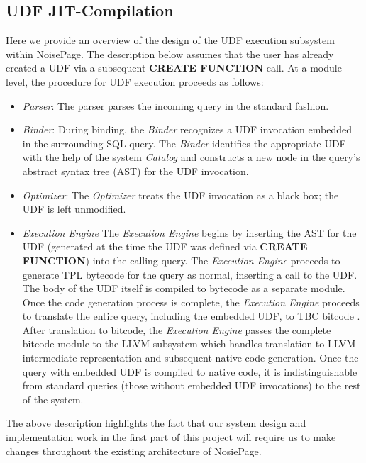 \documentclass{vldb}
\newcommand{\dbCode}[1]{{\sffamily\small \textbf{#1}}\xspace}
\begin{document}
\subsection{UDF JIT-Compilation}

Here we provide an overview of the design of the UDF execution subsystem within NoisePage. The description below assumes that the user has already created a UDF via a subsequent \dbCode{CREATE FUNCTION} call. At a module level, the procedure for UDF execution proceeds as follows:

\begin{itemize}
    \item \textit{Parser}: The parser parses the incoming query in the standard fashion.
    \item \textit{Binder}: During binding, the \textit{Binder} recognizes a UDF invocation embedded in the surrounding SQL query. The \textit{Binder} identifies the appropriate UDF with the help of the system \textit{Catalog} and constructs a new node in the query's abstract syntax tree (AST) for the UDF invocation.
    \item \textit{Optimizer}: The \textit{Optimizer} treats the UDF invocation as a black box; the UDF is left unmodified.
    \item \textit{Execution Engine} The \textit{Execution Engine} begins by inserting the AST for the UDF (generated at the time the UDF was defined via \dbCode{CREATE FUNCTION}) into the calling query. The \textit{Execution Engine} proceeds to generate TPL \cite{pcq} bytecode for the query as normal, inserting a call to the UDF. The body of the UDF itself is compiled to bytecode as a separate module. Once the code generation process is complete, the \textit{Execution Engine} proceeds to translate the entire query, including the embedded UDF, to TBC bitcode \cite{pcq}. After translation to bitcode, the \textit{Execution Engine} passes the complete bitcode module to the LLVM \cite{llvm} subsystem which handles translation to LLVM intermediate representation and subsequent native code generation. Once the query with embedded UDF is compiled to native code, it is indistinguishable from standard queries (those without embedded UDF invocations) to the rest of the system.  
\end{itemize}

The above description highlights the fact that our system design and implementation work in the first part of this project will require us to make changes throughout the existing architecture of NosiePage.
\end{document}
